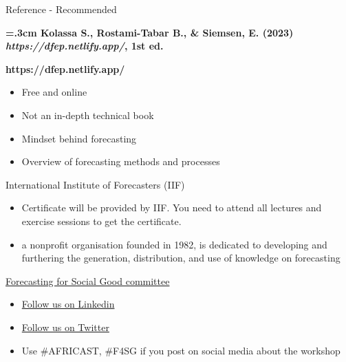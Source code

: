\documentclass[
  14pt,
  ignorenonframetext,
  aspectratio=169,
]{beamer}
\providecommand{\tightlist}{%
  \setlength{\itemsep}{0pt}\setlength{\parskip}{0pt}}
\begin{document}
\begin{frame}{Reference - Recommended}
\protect{}\label{reference---recommended}
\large

\begin{block}{}\bf
{}\hangindent=.3cm
 {Kolassa S., Rostami-Tabar B., \& Siemsen, E. (2023) \emph{https://dfep.netlify.app/}, 1st ed.}
\end{block}\pause
\begin{alertblock}{}\Large
\centerline{\bf https://dfep.netlify.app/}
\end{alertblock}

\pause
\fontsize{11}{11}\sf

\begin{itemize}
\tightlist
\item
  Free and online
\item
  Not an in-depth technical book
\item
  Mindset behind forecasting
\item
  Overview of forecasting methods and processes
\end{itemize}
\end{frame}

\begin{frame}{International Institute of Forecasters (IIF)}
\protect{}\label{international-institute-of-forecasters-iif}
\begin{itemize}
\item
  Certificate will be provided by IIF. You need to attend all lectures
  and exercise sessions to get the certificate.
\item
  a nonprofit organisation founded in 1982, is dedicated to developing
  and furthering the generation, distribution, and use of knowledge on
  forecasting
\end{itemize}
\end{frame}

\begin{frame}{\href{https://www.f4sg.org/}{Forecasting for Social Good
committee}}
\protect{}\label{forecasting-for-social-good-committee}
\begin{itemize}
\tightlist
\item
  \href{https://www.linkedin.com/company/f4sg/}{Follow us on Linkedin}
\item
  \href{https://twitter.com/FSG_forecast}{Follow us on Twitter}
\item
  Use \#AFRICAST, \#F4SG if you post on social media about the workshop
\end{itemize}
\end{frame}
\end{document}
